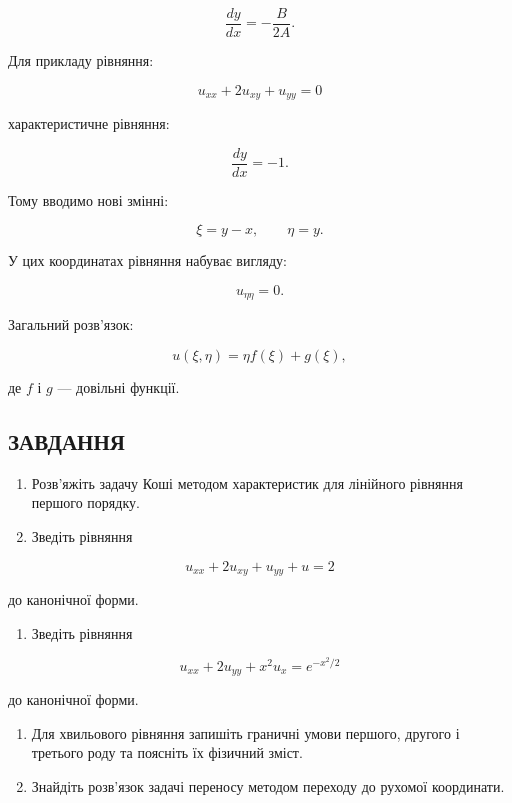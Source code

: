 \documentclass[
  ukrainian,
]{article}
\providecommand{\tightlist}{%
  \setlength{\itemsep}{0pt}\setlength{\parskip}{0pt}}
\begin{document}
\[
\frac{dy}{dx} = -\frac{B}{2A}.
\]

Для прикладу рівняння:

\[
u_{xx} + 2u_{xy} + u_{yy} = 0
\]

характеристичне рівняння:

\[
\frac{dy}{dx} = -1.
\]

Тому вводимо нові змінні:

\[
\xi = y - x, \qquad \eta = y.
\]

У цих координатах рівняння набуває вигляду:

\[
u_{\eta\eta} = 0.
\]

Загальний розв'язок:

\[
u(\xi,\eta) = \eta f(\xi) + g(\xi),
\]

де \(f\) і \(g\) --- довільні функції.

\subsection{ЗАВДАННЯ}\label{ux437ux430ux432ux434ux430ux43dux43dux44f-14}

\begin{enumerate}
\def\labelenumi{\arabic{enumi}.}
\item
  Розв'яжіть задачу Коші методом характеристик для лінійного рівняння
  першого порядку.
\item
  Зведіть рівняння
\end{enumerate}

\[
u_{xx} + 2u_{xy} + u_{yy} + u = 2
\]

до канонічної форми.

\begin{enumerate}
\def\labelenumi{\arabic{enumi}.}
\setcounter{enumi}{2}
\tightlist
\item
  Зведіть рівняння
\end{enumerate}

\[
u_{xx} + 2u_{yy} + x^2 u_x = e^{-x^2/2}
\]

до канонічної форми.

\begin{enumerate}
\def\labelenumi{\arabic{enumi}.}
\setcounter{enumi}{3}
\item
  Для хвильового рівняння запишіть граничні умови першого, другого і
  третього роду та поясніть їх фізичний зміст.
\item
  Знайдіть розв'язок задачі переносу методом переходу до рухомої
  координати.
\end{enumerate}
\end{document}
